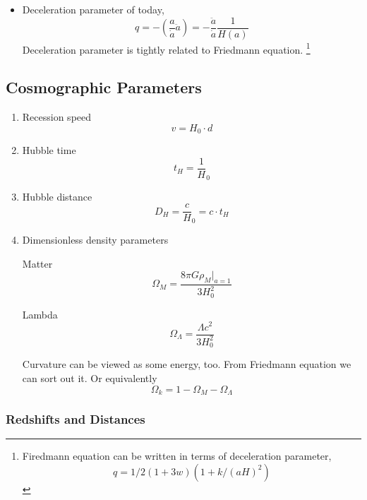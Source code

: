 \documentclass[12pt,a4paper]{book}
\begin{document}
\begin{itemize}
\item
Deceleration parameter of today, 
\[q=-\left( \frac{a}{\dot a}\ddot a \right)=-\frac{\ddot a}{\dot a}\frac{1}{H(a)}\]
Deceleration parameter is tightly related to Friedmann equation.
\footnote{Firedmann equation can be written in terms of deceleration parameter,\[q=1/2(1+3w)(1+k/(aH)^2)\]}


\end{itemize}


\subsection{Cosmographic Parameters}
\begin{enumerate}
\item
Recession speed
\begin{equation}
v = H_0 \cdot d
\end{equation}

\item
Hubble time
\begin{equation}
	t_H = \frac 1 H_0
\end{equation}

\item
Hubble distance
\begin{equation}
	D_H = \frac c H_0 = c \cdot t_H
\end{equation}

\item
Dimensionless density parameters

Matter
\begin{equation}
	\Omega_M = \frac{8\pi G \rho_M |_{a=1}}{3H_0^2}
\end{equation}

Lambda
\begin{equation}
	\Omega_\Lambda = \frac{\Lambda c^2}{3H_0^2}
\end{equation}

Curvature can be viewed as some energy, too.
From Friedmann equation we can sort out it. Or equivalently
\begin{equation}
	\Omega_k = 1- \Omega_M- \Omega_\Lambda
\end{equation}

\end{enumerate}




\subsubsection{Redshifts and Distances}
\end{document}
